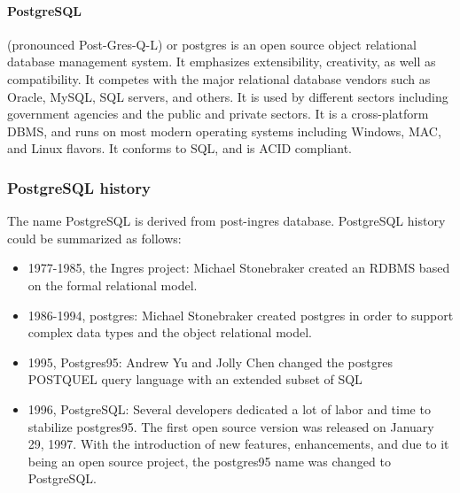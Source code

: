 \paragraph{PostgreSQL} (pronounced Post-Gres-Q-L) or postgres is an open source object relational database management system. It emphasizes extensibility, creativity, as well as compatibility. It competes with the major relational database vendors such as Oracle, MySQL, SQL servers, and others. It is used by different sectors including government agencies and the public and private sectors. It is a cross-platform DBMS, and runs on most modern operating systems including Windows, MAC, and Linux flavors. It conforms to SQL, and is ACID compliant.

\subsubsection*{PostgreSQL history}
The name PostgreSQL is derived from post-ingres database. PostgreSQL history could be summarized as follows:
\begin{itemize}
	\item 1977-1985, the Ingres project: Michael Stonebraker created an RDBMS based on the formal relational model.
	\item 1986-1994, postgres: Michael Stonebraker created postgres in order to support complex data types and the object relational model.
	\item 1995, Postgres95: Andrew Yu and Jolly Chen changed the postgres POSTQUEL query language with an extended subset of SQL
	\item 1996, PostgreSQL: Several developers dedicated a lot of labor and time to stabilize postgres95. The first open source version was released on January 29, 1997. With the introduction of new features, enhancements, and due to it being an open source project, the postgres95 name was changed to PostgreSQL.
\end{itemize}


